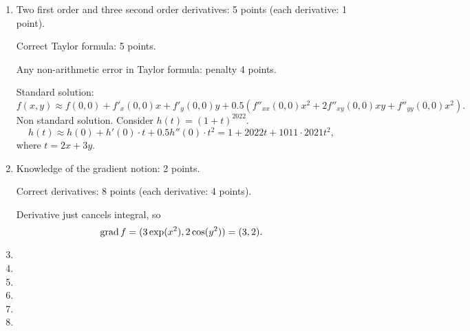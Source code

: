 \begin{enumerate}
    \item Two first order and three second order derivatives: 5 points (each derivative: 1 point).
    
    Correct Taylor formula: 5 points. 

    Any non-arithmetic error in Taylor formula: penalty 4 points. 

    Standard solution:
    \[
    f(x, y) \approx f(0, 0) + f'_x(0, 0) x + f'_y(0, 0) y + 0.5 (f''_{xx}(0, 0) x^2 + 2f''_{xy}(0, 0) xy + f''_{yy}(0, 0) x^2).
    \]
    Non standard solution. Consider $h(t) = (1 + t)^{2022}$.
    \[
    h(t)  \approx h(0) + h'(0) \cdot t + 0.5 h''(0)\cdot t^2 = 1 + 2022t + 1011 \cdot 2021 t^2,
    \]
    where $t = 2x + 3y$.


    \item Knowledge of the gradient notion: 2 points. 
    
    Correct derivatives: 8 points (each derivative: 4 points).

    Derivative just cancels integral, so
    \[
        \mathrm{grad}\, f = (3 \exp(x^2), 2 \cos(y^2)) = (3, 2).
    \]
    
    \item 
    \item 
    \item 
    \item 
    \item 
    \item 
\end{enumerate}
